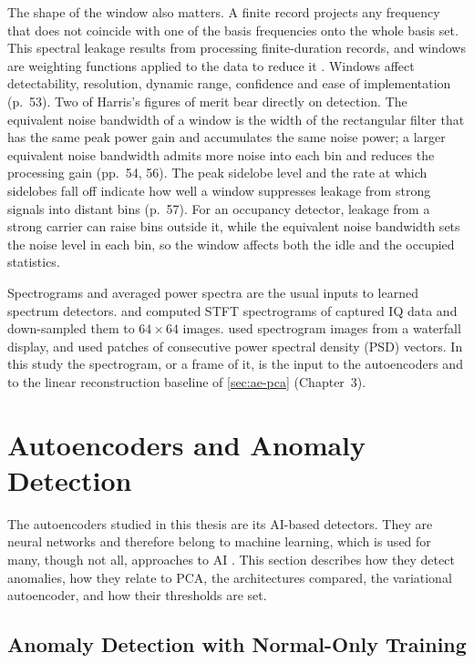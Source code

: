 The shape of the window also matters. A finite record projects any frequency that does not coincide with one of the basis frequencies onto the whole basis set. This spectral leakage results from processing finite-duration records, and windows are weighting functions applied to the data to reduce it \parencite[p.~52]{harris1978}. Windows affect detectability, resolution, dynamic range, confidence and ease of implementation (p.~53). Two of Harris's figures of merit bear directly on detection. The equivalent noise bandwidth of a window is the width of the rectangular filter that has the same peak power gain and accumulates the same noise power; a larger equivalent noise bandwidth admits more noise into each bin and reduces the processing gain (pp.~54, 56). The peak sidelobe level and the rate at which sidelobes fall off indicate how well a window suppresses leakage from strong signals into distant bins (p.~57). For an occupancy detector, leakage from a strong carrier can raise bins outside it, while the equivalent noise bandwidth sets the noise level in each bin, so the window affects both the idle and the occupied statistics.

Spectrograms and averaged power spectra are the usual inputs to learned spectrum detectors. \Textcite[p.~4]{xu2021} and \textcite[p.~4]{tian2022} computed STFT spectrograms of captured IQ data and down-sampled them to $64 \times 64$ images. \Textcite{tandiya2018} used spectrogram images from a waterfall display, and \textcite{rajendran2020} used patches of consecutive power spectral density (PSD) vectors. In this study the spectrogram, or a frame of it, is the input to the autoencoders and to the linear reconstruction baseline of \cref{sec:ae-pca} (Chapter~3).

\section{Autoencoders and Anomaly Detection}
\label{sec:ae}

The autoencoders studied in this thesis are its AI-based detectors. They are neural networks \parencite[p.~499]{goodfellow2016} and therefore belong to machine learning, which is used for many, though not all, approaches to AI \parencite[p.~9]{goodfellow2016}. This section describes how they detect anomalies, how they relate to PCA, the architectures compared, the variational autoencoder, and how their thresholds are set.

\subsection{Anomaly Detection with Normal-Only Training}
\label{sec:ae-anomaly}

